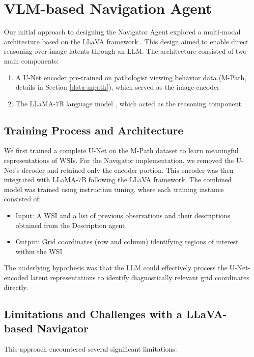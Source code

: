 \section{VLM-based Navigation Agent}
\label{supp:llava-nav}

Our initial approach to designing the Navigator Agent explored a multi-modal architecture based on the LLaVA framework \cite{liu2023improved}. This design aimed to enable direct reasoning over image latents through an LLM. The architecture consisted of two main components:

\begin{enumerate}
    \item A U-Net encoder \cite{ronneberger2015u} pre-trained on pathologist viewing behavior data (M-Path, details in Section \ref{data-mpath}), which served as the image encoder
    \item The LLaMA-7B language model \cite{touvron2023llama}, which acted as the reasoning component
\end{enumerate}

\subsection{Training Process and Architecture}
We first trained a complete U-Net on the M-Path dataset to learn meaningful representations of WSIs. For the Navigator implementation, we removed the U-Net's decoder and retained only the encoder portion. This encoder was then integrated with LLaMA-7B following the LLaVA framework. The combined model was trained using instruction tuning, where each training instance consisted of:
\begin{itemize}
    \item Input: A WSI and a list of previous observations and their descriptions obtained from the Description agent
    \item Output: Grid coordinates (row and column) identifying regions of interest within the WSI
\end{itemize}

The underlying hypothesis was that the LLM could effectively process the U-Net-encoded latent representations to identify diagnostically relevant grid coordinates directly.

\subsection{Limitations and Challenges with a LLaVA-based Navigator}
This approach encountered several significant limitations:

